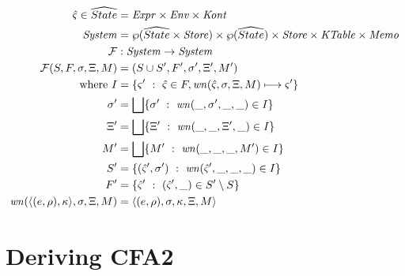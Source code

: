 \documentclass{llncs}
\begin{document}
\begin{align*}
  \hat\varsigma \in \widehat{State} &= \mathit{Expr} \times \mathit{Env} \times \mathit{Kont} \\
  \mathit{System} &= \wp(\widehat{State} \times \mathit{Store}) \times \wp(\widehat{State}) \times \mathit{Store} \times \mathit{KTable} \times \mathit{Memo} \\
  {\mathcal F} &: \mathit{System} \to \mathit{System} \\
  {\mathcal F}(S, F, \sigma, \Xi, M) &= (S \cup S', F', \sigma', \Xi', M') \\
  \text{where } I &= \{ \varsigma'\ :\ \hat\varsigma \in F, \mathit{wn}(\hat\varsigma,\sigma,\Xi,M) \longmapsto \varsigma'\} \\
                \sigma' &= \bigsqcup\{ \sigma'\ :\ \mathit{wn}(\_, \sigma',\_,\_) \in I\} \\
                \Xi' &=  \bigsqcup\{ \Xi'\ :\ \mathit{wn}(\_, \_, \Xi', \_) \in I\} \\
                M' &=  \bigsqcup\{ M'\ :\ \mathit{wn}(\_, \_, \_, M') \in I\} \\
                S' &= \{ (\hat\varsigma',\sigma')\ :\ \mathit{wn}(\hat\varsigma', \_, \_, \_) \in I\} \\
                F' &= \{ \hat\varsigma'\ :\ (\hat\varsigma',\_) \in S' \setminus S\} \\
                \mathit{wn}(\langle (e,\rho),\kappa \rangle,\sigma,\Xi,M) &= \langle (e,\rho),\sigma,\kappa,\Xi,M \rangle
\end{align*}

\section{Deriving CFA2}
\label{sec:cfa2}
\end{document}
